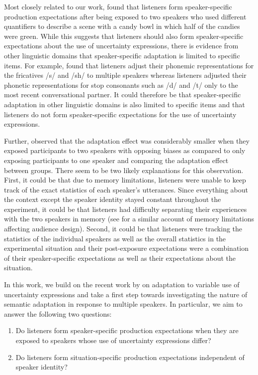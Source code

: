 \documentclass[10pt,letterpaper]{article}
\begin{document}
Most closely related to our work,  found that listeners 
form speaker-specific production expectations after being exposed to 
two speakers who used different 
quantifiers to describe a scene with a candy bowl
in which half of the candies were green. While this suggests
that listeners should also form speaker-specific expectations
about the use of uncertainty expressions, there is evidence from
other linguistic domains that speaker-specific adaptation is limited to specific items.
For example,  found that listeners adjust their phonemic
representations for the fricatives /s/ and /sh/ to multiple speakers whereas listeners
adjusted their phonetic representations for stop consonants such as /d/ and /t/ only
to the most recent conversational partner. It could therefore be that speaker-specific adaptation
in other linguistic domains is also limited to specific items and that listeners do not
form speaker-specific expectations for the use of uncertainty expressions.

Further,  observed that the adaptation effect was considerably smaller
when they exposed participants to two speakers with opposing biases as compared 
to only exposing participants to one speaker and comparing the adaptation 
effect between groups. There seem to be two likely explanations for this observation.
First, it could be that due to memory limitations, listeners were unable 
to keep track of the exact statistics of each speaker's utterances. Since
everything about the context except the speaker identity stayed constant
throughout the experiment, it could be that listeners had difficulty 
separating their experiences with the two speakers in memory (see  for 
a similar account of memory limitations affecting audience design). Second, it
could be that listeners were tracking the statistics of the individual speakers as
well as the overall statistics in the experimental situation and their post-exposure
expectations were a combination of their speaker-specific expectations as well as 
their expectations about the situation.

In this work, we build on the recent work by  on 
adaptation to variable use of uncertainty expressions and 
take a first step towards investigating the nature of semantic adaptation 
in response to multiple speakers. 
In particular,
we aim to answer the following two questions:
\begin{enumerate}
    \item Do listeners form speaker-specific production expectations when they are 
             exposed to speakers whose use of uncertainty expressions differ? 
    \item Do listeners form situation-specific production expectations independent of speaker identity?
\end{enumerate}    
\end{document}
